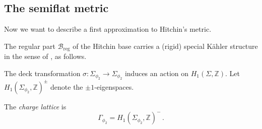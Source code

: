 \documentclass[12pt,letterpaper,reqno]{article}
\numberwithin{equation}{section}
\newcommand{\cB}{\ensuremath{\mathcal B}}
\newcommand{\cM}{\ensuremath{\mathcal M}}
\newcommand{\bbZ}{\ensuremath{\mathbb Z}}
\newcommand{\kahler}{K\"ahler\xspace}
\newcommand{\hk}{hyperk\"ahler\xspace}
\newcommand{\reg}{\mathrm{reg}}
\newcommand{\ti}[1]{\textit{#1}}
\DeclareMathOperator{\Tr}{Tr}
\newcommand{\fixme}[1]{{\color{orange}{[#1]}}}
\begin{document}








\subsection{The semiflat metric}

Now we want to describe a first approximation to Hitchin's metric.

The regular part $\cB_\reg$ of the Hitchin base 
carries a (rigid) special \kahler structure 
in the sense of \cite{Freed:1997dp}, as follows.

The deck transformation $\sigma: \Sigma_{\phi_2} \to \Sigma_{\phi_2}$
induces an action on $H_1(\Sigma, \bbZ)$.
Let $H_1(\Sigma_{\phi_2}, \bbZ)^\pm$ denote the $\pm 1$-eigenspaces.

\begin{defn}
The \ti{charge lattice} is
\begin{equation}
    \Gamma_{\phi_2} = H_1(\Sigma_{\phi_2}, \bbZ)^- \, .
\end{equation}
\end{defn}
\end{document}
